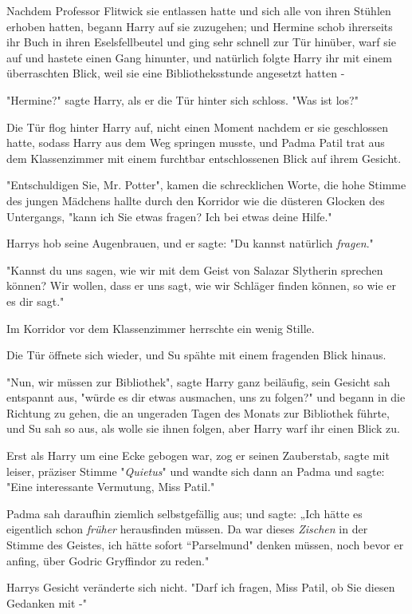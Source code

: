 {Nachdem Professor Flitwick sie entlassen hatte und sich alle von ihren Stühlen erhoben hatten, begann Harry auf sie zuzugehen; und Hermine schob ihrerseits ihr Buch in ihren Eselsfellbeutel und ging sehr schnell zur Tür hinüber, warf sie auf und hastete einen Gang hinunter, und natürlich folgte Harry ihr mit einem überraschten Blick, weil sie eine Bibliotheksstunde angesetzt hatten -

"Hermine?" sagte Harry, als er die Tür hinter sich schloss. "Was ist los?"

Die Tür flog hinter Harry auf, nicht einen Moment nachdem er sie geschlossen hatte, sodass Harry aus dem Weg springen musste, und Padma Patil trat aus dem Klassenzimmer mit einem furchtbar entschlossenen Blick auf ihrem Gesicht.

"Entschuldigen Sie, Mr. Potter", kamen die schrecklichen Worte, die hohe Stimme des jungen Mädchens hallte durch den Korridor wie die düsteren Glocken des Untergangs, "kann ich Sie etwas fragen? Ich bei etwas deine Hilfe."

Harrys hob seine Augenbrauen, und er sagte: "Du kannst natürlich \emph{fragen}."

"Kannst du uns sagen, wie wir mit dem Geist von Salazar Slytherin sprechen können? Wir wollen, dass er uns sagt, wie wir Schläger finden können, so wie er es dir sagt."

Im Korridor vor dem Klassenzimmer herrschte ein wenig Stille.

Die Tür öffnete sich wieder, und Su spähte mit einem fragenden Blick hinaus.

"Nun, wir müssen zur Bibliothek", sagte Harry ganz beiläufig, sein Gesicht sah entspannt aus, "würde es dir etwas ausmachen, uns zu folgen?" und begann in die Richtung zu gehen, die an ungeraden Tagen des Monats zur Bibliothek führte, und Su sah so aus, als wolle sie ihnen folgen, aber Harry warf ihr einen Blick zu.

Erst als Harry um eine Ecke gebogen war, zog er seinen Zauberstab, sagte mit leiser, präziser Stimme "\emph{Quietus}" und wandte sich dann an Padma und sagte: "Eine interessante Vermutung, Miss Patil."

Padma sah daraufhin ziemlich selbstgefällig aus; und sagte: „Ich hätte es eigentlich schon \emph{früher} herausfinden müssen. Da war dieses \emph{Zischen} in der Stimme des Geistes, ich hätte sofort “Parselmund" denken müssen, noch bevor er anfing, über Godric Gryffindor zu reden."

Harrys Gesicht veränderte sich nicht. "Darf ich fragen, Miss Patil, ob Sie diesen Gedanken mit -"

}

